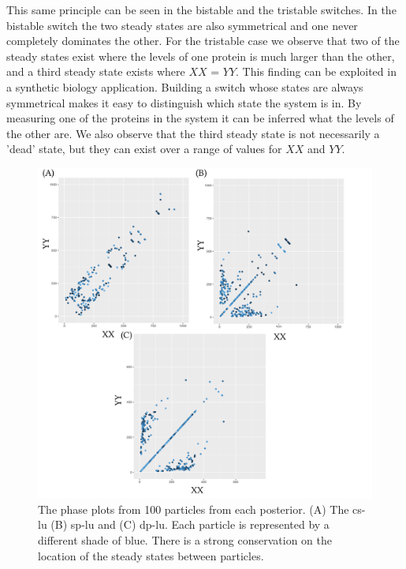 This same principle can be seen in the bistable and the tristable switches. In the bistable switch the two steady states are also symmetrical and one never completely dominates the other. For the tristable case we observe that two of the steady states exist where the levels of one protein is much larger than the other, and a third steady state exists where $XX$ = $YY$. This finding can be exploited in a synthetic biology application. Building a switch whose states are always symmetrical makes it easy to distinguish which state the system is in. By measuring one of the proteins in the system it can be inferred what the levels of the other are. We also observe that the third steady state is not necessarily a 'dead' state, but they can exist over a range of values for $XX$ and $YY$.

\begin{figure}[bp]
	\begin{center}
		\includegraphics[width=\textwidth]{../../chapters/chapterStabilityFinder/images/LU-234-phase-all.png}
		\caption[Phase plots of multistable switches]{ \label{fig:lu_234_phase}The phase plots from 100 particles from each posterior. (A) The \acrshort{cs-lu} (B) \acrshort{sp-lu} and (C) \acrshort{dp-lu}. Each particle is represented by a different shade of blue. There is a strong conservation on the location of the steady states between particles.  }
	\end{center}
\end{figure}


